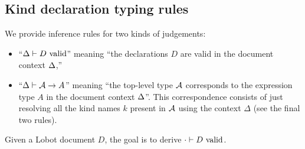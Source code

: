 \documentclass{article}
\begin{document}

\subsection{Kind declaration typing rules}



We provide inference rules for two kinds of judgements: 
\begin{itemize}
    \item ``$\Delta \vdash D \text{ valid}$'' meaning ``the declarations $D$ are valid in the document context $\Delta$,''
    \item ``$\Delta \vdash \mathcal{A} \to A$'' meaning ``the top-level type $\mathcal{A}$ corresponds to the expression type $A$ in the document context $\Delta$''. This correspondence consists of just resolving all the kind names $k$ present in $\mathcal{A}$ using the context $\Delta$ (see the final two rules).
\end{itemize}
Given a Lobot document $D$, the goal is to derive $\cdot \vdash D \text{ valid}$. \\
\end{document}

